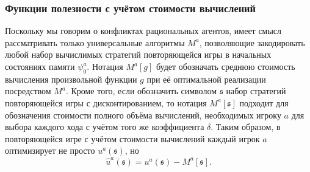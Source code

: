 \begin{frame}
	\frametitle{Функции полезности с учётом стоимости вычислений}
	Поскольку мы говорим о конфликтах рациональных агентов, имеет смысл рассматривать только универсальные алгоритмы $M^a$, позволяющие закодировать любой набор вычислимых стратегий повторяющейся игры в начальных состояниях памяти $\psi^a_0$. Нотация $M^a[g]$ будет обозначать среднюю стоимость вычисления произвольной функции $g$ при её оптимальной реализации посредством $M^a$. Кроме того, если обозначить символом $\mathfrak{s}$ набор стратегий повторяющейся игры с дисконтированием, то нотация $M^a[\mathfrak{s}]$ подходит для обозначения стоимости полного объёма вычислений, необходимых игроку $a$ для выбора каждого хода с учётом того же коэффициента $\delta$. Таким образом, в повторяющейся игре с учётом стоимости вычислений каждый игрок $a$ оптимизирует не просто $u^a(\mathfrak{s})$, но
	\begin{equation*}
		\hat{u}^a(\mathfrak{s}) = u^a(\mathfrak{s}) - M^a[\mathfrak{s}].	
	\end{equation*}
\end{frame}

%

